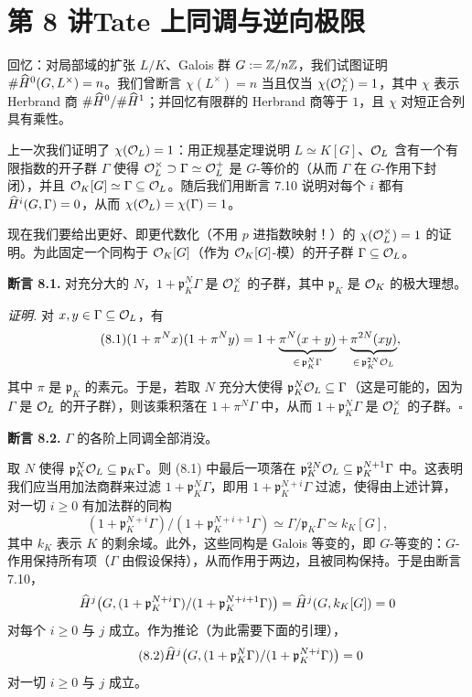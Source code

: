 \section*{第 8 讲\quad Tate 上同调与逆向极限}

回忆：对局部域的扩张 $L/K$、Galois 群 $G:=\mathbb{Z}/n\mathbb{Z}$，我们试图证明 $\#\widehat{H}^0(G,L^\times)=n$。我们曾断言 $\chi(L^\times)=n$ 当且仅当 $\chi(\mathcal{O}_L^\times)=1$，其中 $\chi$ 表示 Herbrand 商 $\#\widehat{H}^0/\#\widehat{H}^1$；并回忆有限群的 Herbrand 商等于 $1$，且 $\chi$ 对短正合列具有乘性。

上一次我们证明了 $\chi(\mathcal{O}_L)=1$：用正规基定理说明 $L\simeq K[G]$、$\mathcal{O}_L$ 含有一个有限指数的开子群 $\Gamma$ 使得 $\mathcal{O}_L^\times\supset\Gamma\simeq\mathcal{O}_L^+$ 是 $G$-等价的（从而 $\Gamma$ 在 $G$-作用下封闭），并且 $\mathcal{O}_K[G]\simeq\Gamma\subseteq\mathcal{O}_L$。随后我们用断言 7.10 说明对每个 $i$ 都有 $\widehat{H}^i(G,\Gamma)=0$，从而 $\chi(\mathcal{O}_L)=\chi(\Gamma)=1$。

现在我们要给出更好、即更代数化（不用 $p$ 进指数映射！）的 $\chi(\mathcal{O}_L^\times)=1$ 的证明。为此固定一个同构于 $\mathcal{O}_K[G]$（作为 $\mathcal{O}_K[G]$-模）的开子群 $\Gamma\subseteq\mathcal{O}_L$。

\textbf{断言 8.1.} 对充分大的 $N$，$1+\mathfrak p_K^N\Gamma$ 是 $\mathcal{O}_L^\times$ 的子群，其中 $\mathfrak p_K$ 是 $\mathcal{O}_K$ 的极大理想。

\textit{证明.} 对 $x,y\in\Gamma\subseteq\mathcal{O}_L$，有
\begin{equation}\tag{8.1}
(1+\pi^Nx)(1+\pi^Ny)=1+\underbrace{\pi^N(x+y)}_{\in\,\mathfrak p_K^N\Gamma}+\underbrace{\pi^{2N}(xy)}_{\in\,\mathfrak p_K^{2N}\mathcal{O}_L},
\end{equation}
其中 $\pi$ 是 $\mathfrak p_K$ 的素元。于是，若取 $N$ 充分大使得 $\mathfrak p_K^N\mathcal{O}_L\subseteq\Gamma$（这是可能的，因为 $\Gamma$ 是 $\mathcal{O}_L$ 的开子群），则该乘积落在 $1+\pi^N\Gamma$ 中，从而 $1+\mathfrak p_K^N\Gamma$ 是 $\mathcal{O}_L^\times$ 的子群。\hfill$\square$

\textbf{断言 8.2.} $\Gamma$ 的各阶上同调全部消没。

取 $N$ 使得 $\mathfrak p_K^N\mathcal{O}_L\subseteq\mathfrak p_K\Gamma$。则 (8.1) 中最后一项落在 $\mathfrak p_K^{2N}\mathcal{O}_L\subseteq\mathfrak p_K^{N+1}\Gamma$ 中。这表明我们应当用加法商群来过滤 $1+\mathfrak p_K^N\Gamma$，即用 $1+\mathfrak p_K^{N+i}\Gamma$ 过滤，使得由上述计算，对一切 $i\ge 0$ 有加法群的同构
\[
(1+\mathfrak p_K^{N+i}\Gamma)/(1+\mathfrak p_K^{N+i+1}\Gamma)\simeq\Gamma/\mathfrak p_K\Gamma\simeq k_K[G],
\]
其中 $k_K$ 表示 $K$ 的剩余域。此外，这些同构是 Galois 等变的，即 $G$-等变的：$G$-作用保持所有项（$\Gamma$ 由假设保持），从而作用于两边，且被同构保持。于是由断言 7.10，
\[
\widehat{H}^j\big(G,(1+\mathfrak p_K^{N+i}\Gamma)/(1+\mathfrak p_K^{N+i+1}\Gamma)\big)=\widehat{H}^j(G,k_K[G])=0
\]
对每个 $i\ge 0$ 与 $j$ 成立。作为推论（为此需要下面的引理），
\begin{equation}\tag{8.2}
\widehat{H}^j\big(G,(1+\mathfrak p_K^N\Gamma)/(1+\mathfrak p_K^{N+i}\Gamma)\big)=0
\end{equation}
对一切 $i\ge 0$ 与 $j$ 成立。

